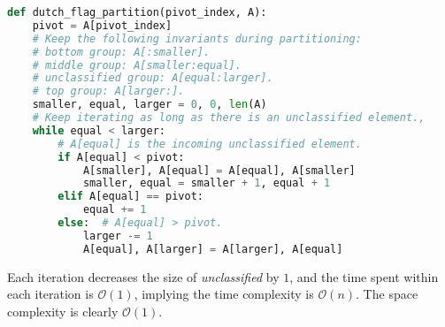 \documentclass[10pt,openany,twoside,letterpaper,extrafontsizes]{memoir}
\newcommand{\myindex}[1]{%
\index[terms]{#1}%
}
\begin{document}
\begin{Spacing}{\arraysSpacing}
\begin{lstlisting}[language=Python]
def dutch_flag_partition(pivot_index, A):
    pivot = A[pivot_index]
    # Keep the following invariants during partitioning:
    # bottom group: A[:smaller].
    # middle group: A[smaller:equal].
    # unclassified group: A[equal:larger].
    # top group: A[larger:].
    smaller, equal, larger = 0, 0, len(A)
    # Keep iterating as long as there is an unclassified element.,
    while equal < larger:
        # A[equal] is the incoming unclassified element.
        if A[equal] < pivot:
            A[smaller], A[equal] = A[equal], A[smaller]
            smaller, equal = smaller + 1, equal + 1
        elif A[equal] == pivot:
            equal += 1
        else:  # A[equal] > pivot.
            larger -= 1
            A[equal], A[larger] = A[larger], A[equal]
\end{lstlisting}
\fi%
Each iteration decreases the size of {\em unclassified} by $1$, and the time spent within each iteration is $\mathcal{O}(1)$, implying the time complexity is $\mathcal{O}(n)$.
The space complexity is clearly $\mathcal{O}(1)$.

%


\end{Spacing}
\end{document}
